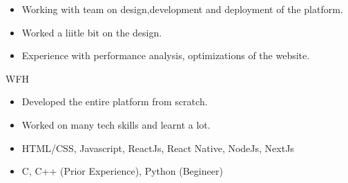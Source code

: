\documentclass[10pt,a4paper,ragged2e]{altacv}
\begin{document}

\begin{fullwidth}
\makecvheader
\end{fullwidth}



\begin{itemize}
\item Working with team on design,development and deployment of the platform.
\smallskip
\item Worked a liitle bit on the design.
\smallskip
\item Experience with performance analysis, optimizations of the website.
\end{itemize}

\divider

 {WFH}
\begin{itemize}
\item Developed the entire platform from scratch. 
\smallskip
\item Worked on many tech skills and learnt a lot.
\end{itemize}

\smallskip
\begin{itemize}
\item HTML/CSS, Javascript, ReactJs, React Native, NodeJs, NextJs
\smallskip
\item C, C++ (Prior Experience), Python (Begineer)
\smallskip
\end{itemize}
\end{document}
